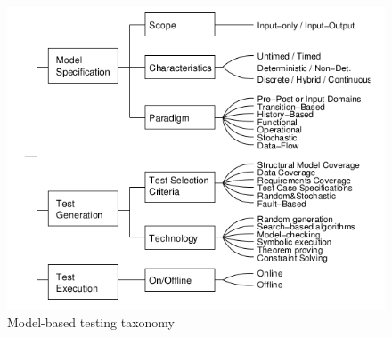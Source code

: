 \begin{figure}[htp]
\centering
\includegraphics[scale=0.5]{figures/mbt_taxonomy.png}
\caption{Model-based testing taxonomy \cite{taxonomy}}
\label{fig:mbttaxonomy}
\end{figure}

